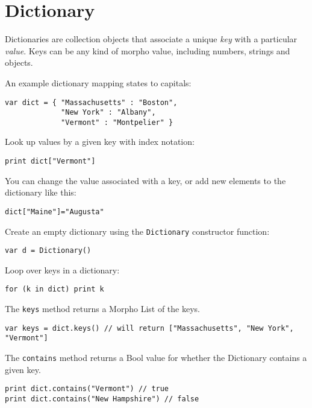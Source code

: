 \hypertarget{dictionary}{%
\section{Dictionary}\label{dictionary}}

Dictionaries are collection objects that associate a unique \emph{key}
with a particular \emph{value}. Keys can be any kind of morpho value,
including numbers, strings and objects.

An example dictionary mapping states to capitals:

\begin{lstlisting}
var dict = { "Massachusetts" : "Boston",
             "New York" : "Albany",
             "Vermont" : "Montpelier" }
\end{lstlisting}

Look up values by a given key with index notation:

\begin{lstlisting}
print dict["Vermont"]
\end{lstlisting}

You can change the value associated with a key, or add new elements to
the dictionary like this:

\begin{lstlisting}
dict["Maine"]="Augusta"
\end{lstlisting}

Create an empty dictionary using the \texttt{Dictionary} constructor
function:

\begin{lstlisting}
var d = Dictionary()
\end{lstlisting}

Loop over keys in a dictionary:

\begin{lstlisting}
for (k in dict) print k
\end{lstlisting}

The \texttt{keys} method returns a Morpho List of the keys.

\begin{lstlisting}
var keys = dict.keys() // will return ["Massachusetts", "New York", "Vermont"]
\end{lstlisting}

The \texttt{contains} method returns a Bool value for whether the
Dictionary contains a given key.

\begin{lstlisting}
print dict.contains("Vermont") // true
print dict.contains("New Hampshire") // false
\end{lstlisting}

